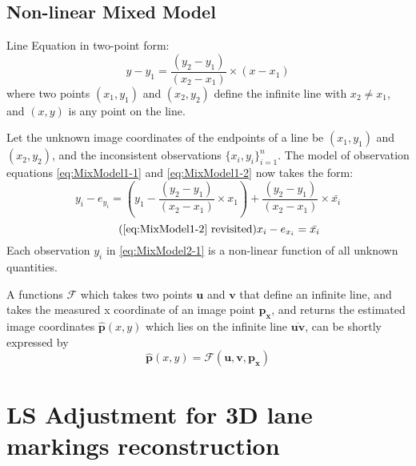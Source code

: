\subsection{Non-linear Mixed Model}
\label{subsec:NonLinear}

Line Equation in two-point form:
\begin{equation} \label{eq:LineInTwoPointForm}
y-y_1 = \dfrac{(y_2-y_1)}{(x_2-x_1)}\times(x-x_1)
\end{equation}
where two points $(x_1,y_1)$ and $(x_2,y_2)$ define the infinite line with $x_2\neq x_1$, and $(x,y)$ is any point on the line.

Let the unknown image coordinates of the endpoints of a line be $(x_1,y_1)$ and $(x_2,y_2)$, and the inconsistent observations $\{x_i,y_i\}^n_{i=1}$. The model of observation equations \eqref{eq:MixModel1-1} and \eqref{eq:MixModel1-2} now takes the form: 
\begin{equation} \label{eq:MixModel2-1}
y_i - e_{y_i}= (y_1-\dfrac{(y_2-y_1)}{(x_2-x_1)}\times x_1) + \dfrac{(y_2-y_1)}{(x_2-x_1)}\times \bar{x_i}
\end{equation}
\begin{equation} \tag{\ref{eq:MixModel1-2} revisited}
x_i-e_{x_i} = \bar{x_i}
\end{equation}
Each observation $y_i$ in \eqref{eq:MixModel2-1} is a non-linear function of all unknown quantities.

A functions $\mathcal{F}$ which takes two points $\mathbf{u}$ and $\mathbf{v}$ that define an infinite line, and takes the measured x coordinate of an image point $\mathbf{p_x}$, and returns the estimated image coordinates $\mathbf{\hat{p}}(x,y)$ which lies on the infinite line $\overline{\mathbf{u}\mathbf{v}}$, can be shortly expressed by
\begin{equation} \label{eq:Ffunction}
\mathbf{\hat{p}}(x,y) = \mathcal{F}(\mathbf{u},\mathbf{v},\mathbf{p_x}) 
\end{equation}




\clearpage
\section{LS Adjustment for 3D lane markings reconstruction}
\label{sec:LSadj}

